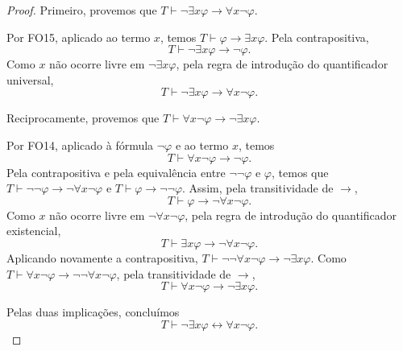 \begin{proof}
    Primeiro, provemos que $T\vdash \neg\exists x\varphi \rightarrow \forall x\neg\varphi$.

    Por FO15, aplicado ao termo $x$, temos $T\vdash \varphi\rightarrow\exists x\varphi$.
    Pela contrapositiva,
    \[
        T\vdash \neg\exists x\varphi\rightarrow\neg\varphi.
    \]
    Como $x$ não ocorre livre em $\neg\exists x\varphi$, pela regra de introdução do quantificador universal,
    \[
        T\vdash \neg\exists x\varphi\rightarrow\forall x\neg\varphi.
    \]

    Reciprocamente, provemos que $T\vdash \forall x\neg\varphi\rightarrow\neg\exists x\varphi$.

    Por FO14, aplicado à fórmula $\neg\varphi$ e ao termo $x$, temos
    \[
        T\vdash \forall x\neg\varphi\rightarrow\neg\varphi.
    \]
    Pela contrapositiva e pela equivalência entre $\neg\neg \varphi$ e $\varphi$, temos que $T\vdash \neg \neg\varphi\rightarrow\neg\forall x\neg\varphi$ e $T\vdash \varphi\rightarrow\neg\neg\varphi$.
    Assim, pela transitividade de $\rightarrow$,
    \[
        T\vdash \varphi\rightarrow\neg\forall x\neg\varphi.
    \]
    Como $x$ não ocorre livre em $\neg\forall x\neg\varphi$, pela regra de introdução do quantificador existencial,
    \[
        T\vdash \exists x\varphi\rightarrow\neg\forall x\neg\varphi.
    \]
    Aplicando novamente a contrapositiva, $T\vdash \neg \neg \forall x\neg\varphi\rightarrow\neg\exists x\varphi$.
    Como $T\vdash \forall x\neg\varphi\rightarrow\neg\neg\forall x\neg\varphi$, pela transitividade de $\rightarrow$,
    \[
        T\vdash \forall x\neg\varphi\rightarrow\neg\exists x\varphi.
    \]

    Pelas duas implicações, concluímos
    \[
        T\vdash \neg\exists x\varphi \leftrightarrow \forall x\neg\varphi.
    \]
\end{proof}

